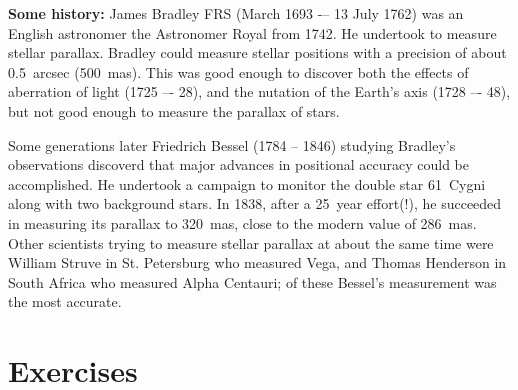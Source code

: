 {\bf Some history:} James Bradley FRS (March 1693 -– 13 July 1762) was an English astronomer the Astronomer Royal from 1742. He undertook to measure stellar parallax. Bradley could measure stellar positions with a precision of about 0.5~arcsec (500~mas). This was good enough to
discover both the effects of aberration of light (1725 –- 28), and the nutation of the Earth's axis (1728 –- 48), but not good enough to measure the parallax of stars.

Some generations later Friedrich Bessel (1784 -- 1846) studying Bradley's observations discoverd
that major advances in positional accuracy could be accomplished. He undertook a campaign to
monitor the double star 61~Cygni along with two background stars. In 1838, after a 25~year effort(!), he succeeded in measuring its parallax to 320~mas, close to the modern value of 
286~mas. Other scientists trying to measure stellar parallax at about the same time were
William Struve in St. Petersburg who measured Vega, and Thomas Henderson in South Africa who measured Alpha Centauri; of these Bessel's measurement was the most accurate.

\section{Exercises}

